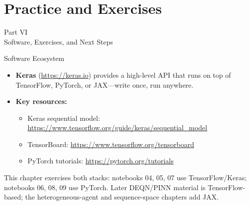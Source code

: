 \documentclass[aspectratio=169,11pt]{beamer}
\newcommand{\emphc}[1]{\textcolor{harvardcrimson}{#1}}
\begin{document}

\section{Practice and Exercises}

\begin{frame}{}
\begin{center}
{\Huge \textcolor{uzhblue}{Part VI}}\\[0.8em]
{\LARGE Software, Exercises, and Next Steps}
\end{center}
\end{frame}

\begin{frame}[shrink=8]{Software Ecosystem}
\begin{center}
\end{center}

\vspace{0.3cm}
\begin{itemize}
    \item \textbf{Keras} (\url{https://keras.io}) provides a high-level API that runs on top of TensorFlow, PyTorch, or JAX---write once, run anywhere.
    \item \textbf{Key resources:}
    \begin{itemize}
        \item Keras sequential model: \url{https://www.tensorflow.org/guide/keras/sequential_model}
        \item TensorBoard: \url{https://www.tensorflow.org/tensorboard}
        \item PyTorch tutorials: \url{https://pytorch.org/tutorials}
    \end{itemize}
\end{itemize}

\vspace{0.2cm}
{\footnotesize\emphc{This chapter exercises both stacks:} notebooks 04, 05, 07 use \emphc{TensorFlow/Keras}; notebooks 06, 08, 09 use \emphc{PyTorch}. Later DEQN/PINN material is TensorFlow-based; the heterogeneous-agent and sequence-space chapters add JAX.}
\end{frame}
\end{document}

